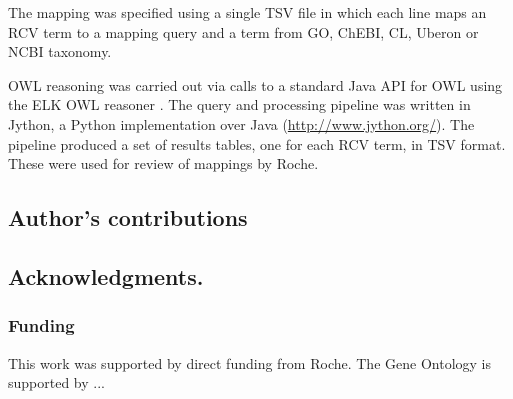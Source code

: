 \documentclass[runningheads,a4paper]{llncs}
\begin{document}
{{{The mapping was specified using a single TSV file in which each line maps an RCV term to a mapping query and a term from GO, ChEBI, CL, Uberon or NCBI taxonomy.

OWL reasoning was carried out via calls to a standard Java API for OWL using the ELK OWL reasoner \cite{kazakov2012}.  The query and processing pipeline was written in Jython, a Python implementation over Java (\url{http://www.jython.org/}).  The pipeline produced a set of results tables, one for each RCV term, in TSV format.  These were used for review of mappings by Roche. 




\subsection*{Author's contributions}


\subsection*{Acknowledgments.}

\subsubsection*{Funding}

This work was supported by direct funding from Roche.  The Gene Ontology is supported by ...










}}}
\end{document}
